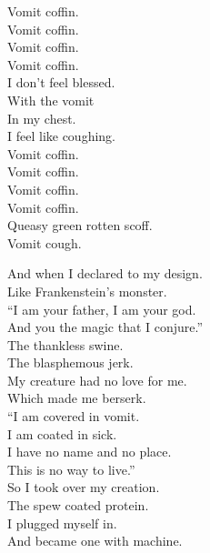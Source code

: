 



Vomit coffin. \\
Vomit coffin. \\
Vomit coffin. \\
Vomit coffin. \\

I don't feel blessed. \\
With the vomit \\
In my chest. \\
I feel like coughing. \\

Vomit coffin. \\
Vomit coffin. \\
Vomit coffin. \\
Vomit coffin. \\

Queasy green rotten scoff. \\

Vomit cough. \\


And when I declared to my design. \\
Like Frankenstein's monster. \\
``I am your father, I am your god. \\
And you the magic that I conjure.'' \\

The thankless swine. \\
The blasphemous jerk. \\
My creature had no love for me. \\
Which made me berserk. \\

``I am covered in vomit. \\
I am coated in sick. \\
I have no name and no place. \\
This is no way to live.'' \\

So I took over my creation. \\
The spew coated protein. \\
I plugged myself in. \\
And became one with machine. \\


